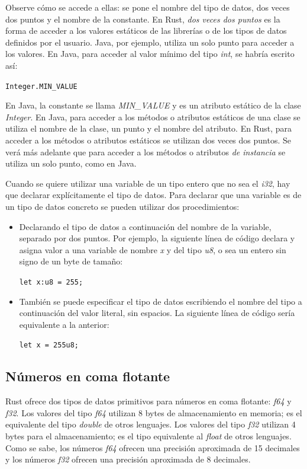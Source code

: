 Observe cómo se accede a ellas: se pone el nombre del tipo de datos, dos veces dos puntos y el nombre de la constante. En Rust, \textit{dos veces dos puntos} es la forma de acceder a los valores estáticos de las librerías o de los tipos de datos definidos por el usuario. Java, por ejemplo, utiliza un solo punto para acceder a los valores. En Java, para acceder al valor mínimo del tipo \textit{int}, se habría escrito así:

{\centering \texttt{Integer.MIN\_VALUE} \par}

En Java, la constante se llama \textit{MIN\_VALUE} y es un atributo estático de la clase \textit{Integer}. En Java, para acceder a los métodos o atributos estáticos de una clase se utiliza el nombre de la clase, un punto y el nombre del atributo. En Rust, para acceder a los métodos o atributos estáticos se utilizan dos veces dos puntos. Se verá más adelante que para acceder a los métodos o atributos \textit{de instancia} se utiliza un solo punto, como en Java.

Cuando se quiere utilizar una variable de un tipo entero que no sea el \textit{i32}, hay que declarar explícitamente el tipo de datos. Para declarar que una variable es de un tipo de datos concreto se pueden utilizar dos procedimientos:

\begin{itemize}
   \item Declarando el tipo de datos a continuación del nombre de la variable, separado por dos puntos. Por ejemplo, la siguiente línea de código declara y asigna valor a una variable de nombre \textit{x} y del tipo \textit{u8}, o sea un entero sin signo de un byte de tamaño:
   
   {\centering \texttt{let x:u8 = 255;} \par}
   
   \item También se puede especificar el tipo de datos escribiendo el nombre del tipo  a continuación del valor literal, sin espacios. La siguiente línea de código sería equivalente a la anterior:
   
   {\centering \texttt{let x = 255u8;} \par}   
\end{itemize}

\subsection{Números en coma flotante}
Rust ofrece dos tipos de datos primitivos para números en coma flotante: \textit{f64} y \textit{f32}. Los valores del tipo \textit{f64} utilizan 8 bytes de almacenamiento en memoria; es el equivalente del tipo \textit{double} de otros lenguajes. Los valores del tipo \textit{f32} utilizan 4 bytes para el almacenamiento; es el tipo equivalente al \textit{float} de otros lenguajes. Como se sabe, los números \textit{f64} ofrecen una precisión aproximada de 15 decimales y los números \textit{f32} ofrecen una precisión aproximada de 8 decimales.

